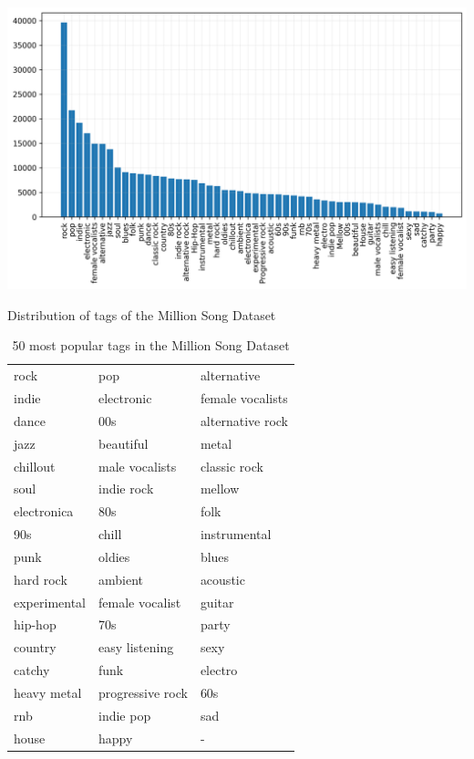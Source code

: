 \begin{marginfigure}
    \centering
    \includegraphics[width=\columnwidth]{figs/tag_stats_msd.png}
    \caption{Distribution of tags of the Million Song Dataset}
    \label{fig:tag_stats_msd}
\end{marginfigure}


\begin{table}[t]
    \centering
    \begin{tabular}{lll}\toprule
        rock & pop & alternative \\
        indie & electronic & female vocalists \\
        dance & 00s & alternative rock \\
        jazz & beautiful & metal \\
        chillout & male vocalists & classic rock \\
        soul & indie rock & mellow \\
        electronica & 80s & folk \\
        90s & chill & instrumental \\
        punk & oldies & blues \\
        hard rock & ambient & acoustic \\
        experimental & female vocalist & guitar \\
        hip-hop & 70s & party \\
        country & easy listening & sexy \\
        catchy & funk & electro \\
        heavy metal & progressive rock & 60s \\
        rnb & indie pop & sad \\
        house & happy & - \\
        \bottomrule
    \end{tabular}
    \caption{50 most popular tags in the Million Song Dataset}
    \label{tab:msd_tags}
\end{table}



